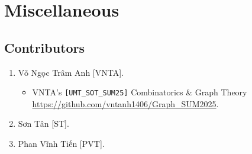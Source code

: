 \documentclass[oneside]{book}
\begin{document}

\chapter{Miscellaneous}

\section{Contributors}

\begin{enumerate}
	\item {\sc Võ Ngọc Trâm Anh [VNTA].}
	\begin{itemize}
		\item VNTA's \verb|[UMT_SOT_SUM25]| Combinatorics \& Graph Theory  \url{https://github.com/vntanh1406/Graph_SUM2025}.
	\end{itemize}
	\item {\sc Sơn Tân [ST].}
	\item {\sc Phan Vĩnh Tiến [PVT].}
\end{enumerate}


\printbibliography[heading=bibintoc]
	
\end{document}
